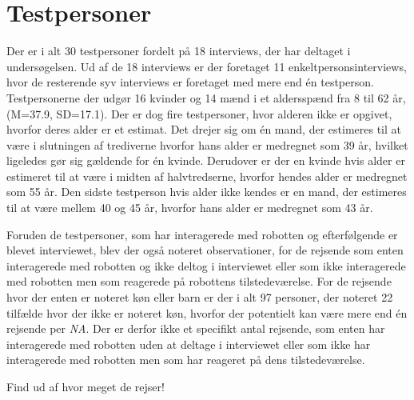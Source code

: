 \section{Testpersoner}
\label{ParametreTestpersoner}
%
Der er i alt 30 testpersoner fordelt på 18 interviews, der har deltaget i undersøgelsen. Ud af de 18 interviews er der foretaget 11 enkeltpersonsinterviews, hvor de resterende syv interviews er foretaget med mere end én testperson. Testpersonerne der udgør 16 kvinder og 14 mænd i et aldersspænd fra 8 til 62 år, (M=37.9, SD=17.1). Der er dog fire testpersoner, hvor alderen ikke er opgivet, hvorfor deres alder er et estimat. Det drejer sig om én mand, der estimeres til at være i slutningen af trediverne hvorfor hans alder er medregnet som 39 år, hvilket ligeledes gør sig gældende for én kvinde. Derudover er der en kvinde hvis alder er estimeret til at være i midten af halvtredserne, hvorfor hendes alder er medregnet som 55 år. Den sidste testperson hvis alder ikke kendes er en mand, der estimeres til at være mellem 40 og 45 år, hvorfor hans alder er medregnet som 43 år. 

Foruden de testpersoner, som har interagerede med robotten og efterfølgende er blevet interviewet, blev der også noteret observationer, for de rejsende som enten interagerede med robotten og ikke deltog i interviewet eller som ikke interagerede med robotten men som reagerede på robottens tilstedeværelse. For de rejsende hvor der enten er noteret køn eller barn er der i alt 97 personer, der noteret 22 tilfælde hvor der ikke er noteret køn, hvorfor der potentielt kan være mere end én rejsende per \textit{NA}. Der er derfor ikke et specifikt antal rejsende, som enten har interagerede med robotten uden at deltage i interviewet eller som ikke har interagerede med robotten men som har reageret på dens tilstedeværelse. \blankline 


Find ud af hvor meget de rejser! 
